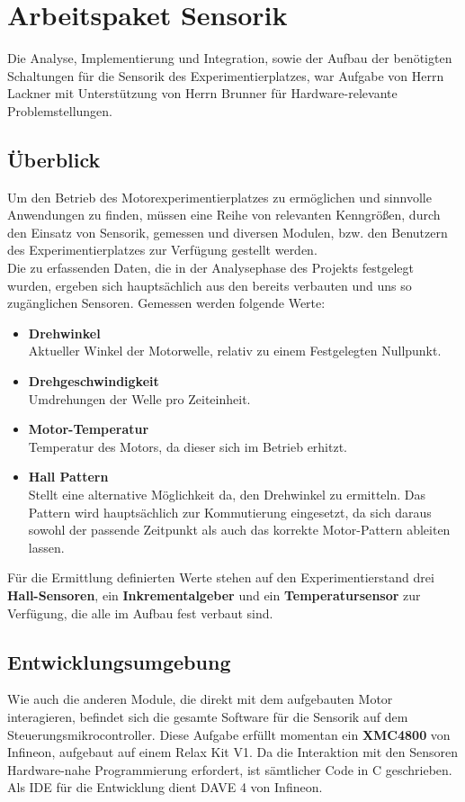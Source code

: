 
\chapter{Arbeitspaket Sensorik}
Die Analyse, Implementierung und Integration, sowie der Aufbau der ben\"otigten Schaltungen f\"ur die Sensorik des Experimentierplatzes, war Aufgabe von Herrn Lackner mit Unterst\"utzung von Herrn Brunner f\"ur Hardware-relevante Problemstellungen.

\section{\"Uberblick}
Um den Betrieb des Motorexperimentierplatzes zu erm\"oglichen und sinnvolle Anwendungen zu finden, m\"ussen eine Reihe von relevanten Kenngr\"o{\ss}en, durch den Einsatz von Sensorik, gemessen und diversen Modulen, bzw. den Benutzern des Experimentierplatzes zur Verf\"ugung gestellt werden. \\
Die zu erfassenden Daten, die in der Analysephase des Projekts festgelegt wurden, ergeben sich haupts\"achlich aus den bereits verbauten und uns so zug\"anglichen Sensoren. Gemessen werden folgende Werte:
\begin{itemize}
\item \textbf{Drehwinkel} \\
Aktueller Winkel der Motorwelle, relativ zu einem Festgelegten Nullpunkt.
\item \textbf{Drehgeschwindigkeit} \\
Umdrehungen der Welle pro Zeiteinheit.
\item \textbf{Motor-Temperatur} \\
Temperatur des Motors, da dieser sich im Betrieb erhitzt.
\item \textbf{Hall Pattern} \\
Stellt eine alternative M\"oglichkeit da, den Drehwinkel zu ermitteln. Das Pattern wird haupts\"achlich zur Kommutierung eingesetzt, da sich daraus sowohl der passende Zeitpunkt als auch das korrekte Motor-Pattern ableiten lassen.
\end{itemize}
Für die Ermittlung definierten Werte stehen auf den Experimentierstand drei \textbf{Hall-Sensoren}, ein \textbf{Inkrementalgeber} und ein \textbf{Temperatursensor} zur Verfügung, die alle im Aufbau fest verbaut sind. 

\section{Entwicklungsumgebung}
Wie auch die anderen Module, die direkt mit dem aufgebauten Motor interagieren, befindet sich die gesamte Software für die Sensorik auf dem Steuerungsmikrocontroller. Diese Aufgabe erfüllt momentan ein \textbf{XMC4800} von Infineon, aufgebaut auf einem Relax Kit V1. Da die Interaktion mit den Sensoren Hardware-nahe Programmierung erfordert, ist sämtlicher Code in C geschrieben. Als IDE für die Entwicklung dient DAVE 4 von Infineon.

